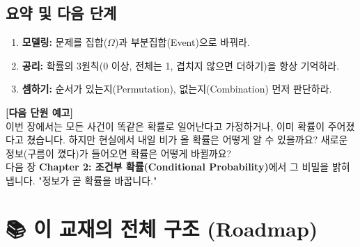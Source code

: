 \documentclass[11pt,a4paper]{book}
\theoremstyle{definition}
\begin{document}
\section{요약 및 다음 단계}

\begin{tcolorbox}[colback=mainblue!10, colframe=mainblue, title={\textbf{📝 Unit 1-1 핵심 요약}}]
\begin{enumerate}
    \item \textbf{모델링:} 문제를 집합($\Omega$)과 부분집합(Event)으로 바꿔라.
    \item \textbf{공리:} 확률의 3원칙(0 이상, 전체는 1, 겹치지 않으면 더하기)을 항상 기억하라.
    \item \textbf{셈하기:} 순서가 있는지(Permutation), 없는지(Combination) 먼저 판단하라.
\end{enumerate}
\end{tcolorbox}

\vspace{0.5cm}
\textbf{[다음 단원 예고]} \\
이번 장에서는 모든 사건이 똑같은 확률로 일어난다고 가정하거나, 이미 확률이 주어졌다고 쳤습니다. 하지만 현실에서 내일 비가 올 확률은 어떻게 알 수 있을까요? 새로운 정보(구름이 꼈다)가 들어오면 확률은 어떻게 바뀔까요? \\
다음 장 \textbf{Chapter 2: 조건부 확률(Conditional Probability)}에서 그 비밀을 밝혀냅니다. "정보가 곧 확률을 바꿉니다."


\chapter{📚 이 교재의 전체 구조 (Roadmap)}
\label{ch:lecture2}

\end{document}

